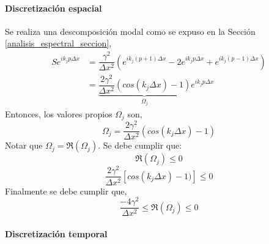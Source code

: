 \paragraph{Discretización espacial}

Se realiza una descomposición modal como se expuso en la Sección \ref{analisis_espectral_seccion},
\begin{align*}
S e ^ { i k_j p \Delta x } &= \dfrac{\gamma^2}{\Delta x^2} \left( e ^ { i k_j (p+1) \Delta x } - 2 e ^ { i k_j p \Delta x } + e ^ { i k_j (p-1) \Delta x } \right) \\
&= \underbrace{\dfrac{2 \gamma^2}{\Delta x^2} \left( cos(k_j \Delta x) - 1 \right)}_{\Omega_j} e ^ { i k_j p \Delta x}
\end{align*}
Entonces, los valores propios $\Omega_j$ son,
\begin{equation} \label{OMEGA_LF}
\Omega_j = \dfrac{2 \gamma^2}{\Delta x^2} \left( cos(k_j \Delta x) - 1 \right)
\end{equation}
Notar que $\Omega_j = \Re(\Omega_j)$. Se debe cumplir que:
\begin{equation*}
\Re(\Omega_j) \leq 0
\end{equation*}
\begin{equation}
\dfrac{2 \gamma^2 }{ \Delta x^2 } \left[ cos(k_j \Delta x) -1 ) \right] \leq 0
\end{equation}
Finalmente se debe cumplir que,
\begin{equation}
\dfrac{-4 \gamma^2}{\Delta x^2} \leq \Re(\Omega_j) \leq 0
\end{equation}

\paragraph{Discretización temporal}

